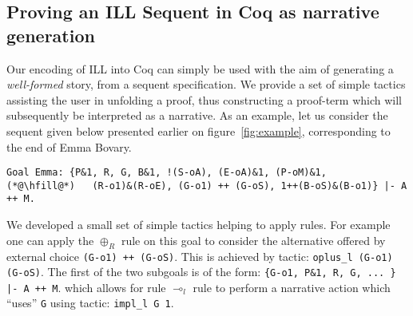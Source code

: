 \documentclass[runningheads,a4paper]{llncs}
\begin{document}
\subsection{Proving an ILL Sequent in Coq as narrative generation}
\label{sec:proving-an-ill}
%
Our encoding of ILL into Coq can simply be used with the aim of generating a \emph{well-formed} story, from a sequent specification. We provide a set of simple tactics assisting the user in unfolding a proof, thus constructing a proof-term which will subsequently be interpreted as a narrative.
%
As an example, let us consider the sequent given below presented earlier on figure~\ref{fig:example}, corresponding to the end of Emma Bovary. 
\begin{lstlisting}[language=Coq]
Goal Emma: {P&1, R, G, B&1, !(S-oA), (E-oA)&1, (P-oM)&1,
(*@\hfill@*)   (R-o1)&(R-oE), (G-o1) ++ (G-oS), 1++(B-oS)&(B-o1)} |- A ++ M.
\end{lstlisting}
We developed a small set of simple tactics helping to apply rules. For
example one can apply the $\oplus_R$ rule on this goal to consider the
alternative offered by external choice \lstinline|(G-o1) ++ (G-oS)|.
This is achieved by tactic: \lstinline|oplus_l (G-o1) (G-oS)|. The
first of the two subgoals is of the form:
\lstinline!{G-o1, P&1, R, G, ... } |- A ++ M!. which allows for rule
$\multimap_l$ rule to perform a narrative action which ``uses''
\lstinline|G| using tactic: \lstinline|impl_l G 1|. 
\end{document}
